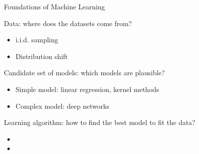 \documentclass[aspectratio=169,12pt]{beamer}
\begin{document}
\begin{frame}[t]{Foundations of Machine Learning}
	
	
	
	\begin{itemize}
		\vspace{0.5cm}
		{\large
			\setlength{\itemsep}{0.5cm}
			\item Data: where does the datasets come from? 
			\vspace{0.2cm}
			\begin{itemize}
				\item i.i.d. sampling
				\item Distribution shift
			\end{itemize}
			\item Candidate set of models: which models are plausible?
			\vspace{0.2cm}
			\begin{itemize}
				\item Simple model: linear regression, kernel methods
				\item Complex model: deep networks
			\end{itemize}
			\item Learning algorithm: how to find the best model to fit the data?
			\vspace{0.2cm}
			\begin{itemize}
				\item[] 
				\item[] 
			\end{itemize}
		}
	\end{itemize}
	
	
\end{frame}
\end{document}
